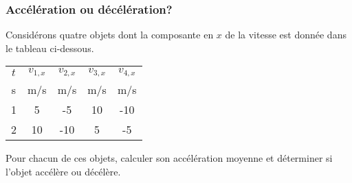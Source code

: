 \documentclass{beamer}
\begin{document}
\begin{frame}
  \frametitle{Accélération ou décélération?}
  Considérons quatre objets dont la composante en $x$ de la vitesse est donnée
  dans le tableau ci-dessous.

  \vspace{0.2cm}
  \begin{center}
    \begin{tabular}{SSSSS}
      \toprule
      $t$ & $v_{1, x}$ & $v_{2, x}$  &  $v_{3, x}$  &  $v_{4, x}$  \\
      \si{s} & \si{m/s} & \si{m/s} & \si{m/s}& \si{m/s} \\
        &   5  &   -5   &  10  &   -10  \\
      2  &  10  &  -10   &  5   &    -5  \\
      \bottomrule
    \end{tabular}
  \end{center}
  \vspace{0.2cm}

  Pour chacun de ces objets, calculer son accélération moyenne et déterminer si
  l'objet accélère ou décélère.

\end{frame}
\end{document}
